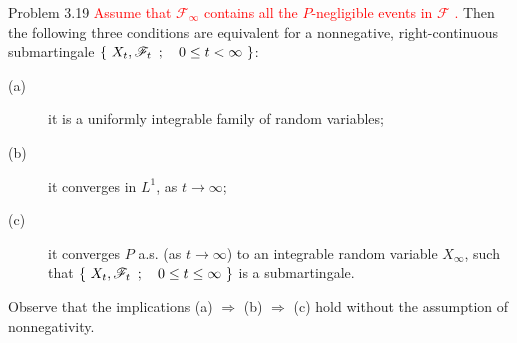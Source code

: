	\begin{itembox}[l]{Problem 3.19}
		\textcolor{red}{Assume that $\mathscr{F}_\infty$ contains all the $P$-negligible events in $\mathscr{F}$ \footnotemark.}
		Then the following three conditions are equivalent for a nonnegative, right-continuous 
		submartingale $\left\{\ X_t,\mathscr{F}_t\ \, ; \quad 0 \leq t < \infty\ \right\}$:
		\begin{description}
			\item[(a)] it is a uniformly integrable family of random variables;
			\item[(b)] it converges in $L^1$, as $t \to \infty$;
			\item[(c)] it converges $P$ a.s. (as $t \to \infty$) to an integrable random variable $X_\infty$,
			such that $\left\{\ X_t,\mathscr{F}_t\ \, ; \quad 0 \leq t \leq \infty\ \right\}$ is a submartingale.
		\end{description}
		Observe that the implications (a) $\Rightarrow$ (b) $\Rightarrow$ (c) hold without the assumption of nonnegativity. 
	\end{itembox}
